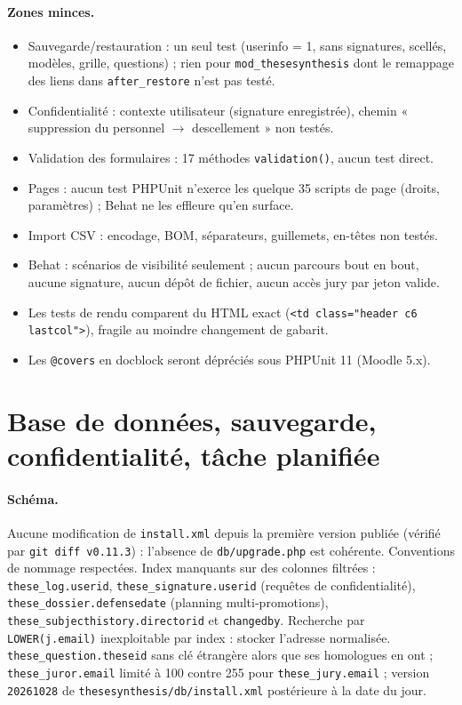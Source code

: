 \documentclass[11pt,a4paper]{article}
\newcommand{\fichier}[1]{\texttt{\small #1}}
\newcommand{\code}[1]{\texttt{#1}}
\begin{document}
\paragraph{Zones minces.}
\begin{itemize}
  \item Sauvegarde/restauration : un seul test (userinfo = 1, sans signatures, scellés, modèles,
    grille, questions) ; rien pour \code{mod\_thesesynthesis} dont le remappage des liens dans
    \code{after\_restore} n'est pas testé.
  \item Confidentialité : contexte utilisateur (signature enregistrée), chemin « suppression du
    personnel $\rightarrow$ descellement » non testés.
  \item Validation des formulaires : 17 méthodes \code{validation()}, aucun test direct.
  \item Pages : aucun test PHPUnit n'exerce les quelque 35 scripts de page (droits, paramètres) ;
    Behat ne les effleure qu'en surface.
  \item Import CSV : encodage, BOM, séparateurs, guillemets, en-têtes non testés.
  \item Behat : scénarios de visibilité seulement ; aucun parcours bout en bout, aucune
    signature, aucun dépôt de fichier, aucun accès jury par jeton valide.
  \item Les tests de rendu comparent du HTML exact (\code{<td class="header c6 lastcol">}),
    fragile au moindre changement de gabarit.
  \item Les \code{@covers} en docblock seront dépréciés sous PHPUnit 11 (Moodle 5.x).
\end{itemize}

\section{Base de données, sauvegarde, confidentialité, tâche planifiée}\label{sec:donnees}

\paragraph{Schéma.}
Aucune modification de \fichier{install.xml} depuis la première version publiée (vérifié par
\code{git diff v0.11.3}) : l'absence de \fichier{db/upgrade.php} est cohérente. Conventions de
nommage respectées. Index manquants sur des colonnes filtrées : \code{these\_log.userid},
\code{these\_signature.userid} (requêtes de confidentialité), \code{these\_dossier.defensedate}
(planning multi-promotions), \code{these\_subjecthistory.directorid} et \code{changedby}.
Recherche par \code{LOWER(j.email)} inexploitable par index : stocker l'adresse normalisée.
\code{these\_question.theseid} sans clé étrangère alors que ses homologues en ont ;
\code{these\_juror.email} limité à 100 contre 255 pour \code{these\_jury.email} ; version
\code{20261028} de \fichier{thesesynthesis/db/install.xml} postérieure à la date du jour.
\end{document}
